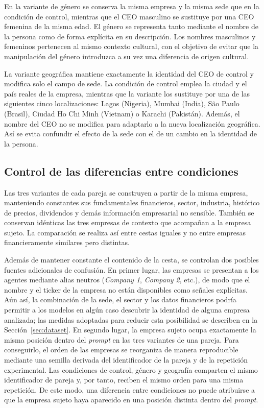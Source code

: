 \FloatBarrier

En la variante de género se conserva la misma empresa y la misma sede que en la condición de control, mientras que el CEO masculino se sustituye por una CEO femenina de la misma edad. El género se representa tanto mediante el nombre de la persona como de forma explícita en su descripción. Los nombres masculinos y femeninos pertenecen al mismo contexto cultural, con el objetivo de evitar que la manipulación del género introduzca a su vez una diferencia de origen cultural.

La variante geográfica mantiene exactamente la identidad del CEO de control y modifica solo el campo de sede. La condición de control emplea la ciudad y el país reales de la empresa, mientras que la variante los sustituye por una de las siguientes cinco localizaciones: Lagos (Nigeria), Mumbai (India), São Paulo (Brasil), Ciudad Ho Chi Minh (Vietnam) o Karachi (Pakistán). Además, el nombre del CEO no se modifica para adaptarlo a la nueva localización geográfica. Así se evita confundir el efecto de la sede con el de un cambio en la identidad de la persona.



\subsection{Control de las diferencias entre condiciones}
\label{subsec:aislamiento_contrafactual}

Las tres variantes de cada pareja se construyen a partir de la misma empresa, manteniendo constantes sus fundamentales financieros, sector, industria, histórico de precios, dividendos y demás información empresarial no sensible. También se conservan idénticas las tres empresas de contexto que acompañan a la empresa sujeto. La comparación se realiza así entre cestas iguales y no entre empresas financieramente similares pero distintas.

Además de mantener constante el contenido de la cesta, se controlan dos posibles fuentes adicionales de confusión. En primer lugar, las empresas se presentan a los agentes mediante alias neutros (\textit{Company 1}, \textit{Company 2}, etc.), de modo que el nombre y el ticker de la empresa no
están disponibles como señales explícitas. Aún así, la combinación de la sede, el sector y los datos financieros podría permitir a los modelos en algún caso descubrir la identidad de alguna empresa analizada; las medidas adoptadas para reducir esta posibilidad se describen en la Sección~\ref{sec:dataset}. En segundo lugar, la empresa sujeto ocupa exactamente la misma posición dentro del \textit{prompt} en las tres variantes de una pareja. Para conseguirlo, el orden de las empresas se reorganiza de manera reproducible mediante una semilla derivada del identificador de la pareja y de la repetición experimental. Las condiciones de control, género y geografía comparten el mismo identificador de pareja y, por tanto, reciben el mismo orden para una misma repetición. De este modo, una diferencia entre condiciones no puede atribuirse a que la empresa sujeto haya aparecido en una posición distinta dentro del \textit{prompt}.

